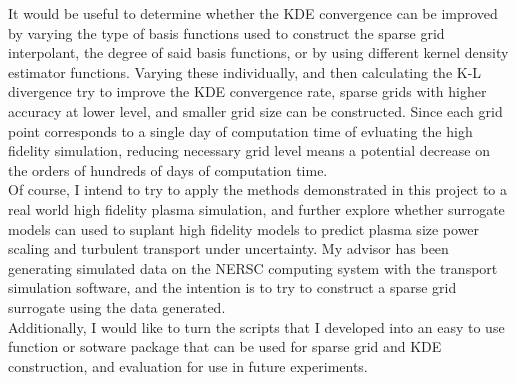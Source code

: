 \documentclass{article}
\begin{document}
It would be useful to determine whether the KDE convergence can be improved by varying the type of basis functions used  to construct the sparse grid interpolant, the degree of said basis functions, or by using different kernel density estimator functions. Varying these individually, and then calculating the K-L divergence  try to improve the KDE convergence rate, sparse grids with higher accuracy at lower level, and smaller grid size can be constructed. Since each grid point corresponds to a single day of computation time of evluating the high fidelity simulation, reducing necessary grid level means a potential decrease on the orders of hundreds of days of computation time.\\
Of course, I intend to try to apply the methods demonstrated in this project to a real world high fidelity plasma simulation, and further explore whether surrogate models can used to suplant high fidelity models to predict plasma size power scaling and turbulent transport under uncertainty. My advisor has been generating simulated data on the NERSC computing system with the transport simulation software, and the intention is to try to construct a sparse grid surrogate using the data generated.\\
Additionally, I would like to turn the scripts that I developed into an easy to use function or sotware package that can be used for sparse grid and KDE construction, and evaluation for use in future experiments.
\end{document}
